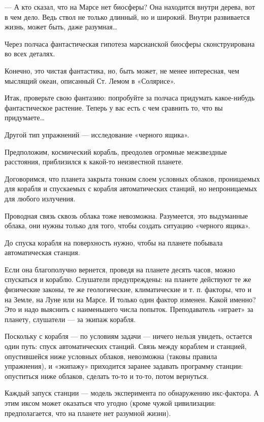 — А кто сказал,  что на Марсе нет  биосферы? Она находится внутри  дерева,
вот в  чем  дело. Ведь  ствол  не только  длинный,  но и  широкий.  Внутри
развивается жизнь, может быть, даже разумная…

Через полчаса фантастическая гипотеза марсианской биосферы сконструирована
во всех деталях.

Конечно, это чистая фантастика, но,  быть может, не менее интересная,  чем
мыслящий океан, описанный Ст. Лемом в «Солярисе».

Итак,  проверьте   свою   фантазию:  попробуйте   за   полчаса   придумать
какое-нибудь фантастическое растение. Теперь у вас есть с чем сравнить то,
что вы придумаете…

Другой тип упражнений — исследование «черного ящика».

Предположим,   космический   корабль,   преодолев   огромные   межзвездные
расстояния, приблизился к какой-то неизвестной планете.

Договоримся,  что   планета  закрыта   тонким  слоем   условных   облаков,
проницаемых для корабля и спускаемых с корабля автоматических станций,  но
непроницаемых для любого излучения.

Проводная связь сквозь облака тоже невозможна. Разумеется, это  выдуманные
облака, они нужны только для того, чтобы создать ситуацию «черного ящика».

До  спуска  корабля  на  поверхность  нужно,  чтобы  на  планете  побывала
автоматическая станция.

Если она благополучно  вернется, проведя  на планете  десять часов,  можно
спускаться и кораблю. Слушатели предупреждены: на планете действуют те  же
физические законы, те же геологические, климатические и т. п. факторы, что
и на Земле,  на Луне или  на Марсе.  И только один  фактор изменен.  Какой
именно? Это и  надо выяснить  с наименьшего  числа попыток.  Преподаватель
«играет» за планету, слушатели — за экипаж корабля.

Поскольку с корабля — по условиям задачи — ничего нельзя увидеть, остается
один путь: спуск автоматических станций. Связь между кораблем и  станцией,
опустившейся   ниже   условных   облаков,   невозможна   (таковы   правила
упражнения), и «экипажу»  приходится заранее  задавать программу  станции:
опуститься ниже облаков, сделать то-то и то-то, потом вернуться.

Каждый запуск  станции —  модель эксперимента по  обнаружению икс-фактора.
А  этим  иксом  может  оказаться  что  угодно  (кроме  чужой  цивилизации:
предполагается, что на планете нет разумной жизни).

